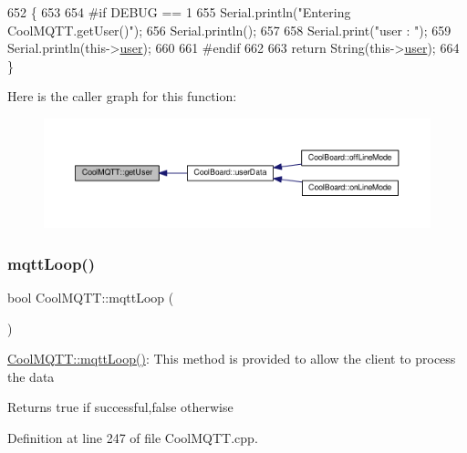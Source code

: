 \begin{DoxyCode}
652 \{
653 
654 \textcolor{preprocessor}{#if DEBUG == 1 }
655     Serial.println(\textcolor{stringliteral}{"Entering CoolMQTT.getUser()"});
656     Serial.println();
657     
658     Serial.print(\textcolor{stringliteral}{"user : "});
659     Serial.println(this->\hyperlink{classCoolMQTT_a8cd47e45d457f908d4b4390b35aaee83}{user});
660 
661 \textcolor{preprocessor}{#endif}
662 
663     \textcolor{keywordflow}{return} String(this->\hyperlink{classCoolMQTT_a8cd47e45d457f908d4b4390b35aaee83}{user});
664 \}
\end{DoxyCode}
Here is the caller graph for this function\+:
\nopagebreak
\begin{figure}[H]
\begin{center}
\leavevmode
\includegraphics[width=350pt]{classCoolMQTT_a373cc92fca7760d886f02d8a6e5b3f63_icgraph}
\end{center}
\end{figure}
\mbox{\label{classCoolMQTT_aa5eaae967b562b62cbcf2b8d81f6e5d5}} 
\subsubsection{\texorpdfstring{mqtt\+Loop()}{mqttLoop()}}
{\footnotesize\ttfamily bool Cool\+M\+Q\+T\+T\+::mqtt\+Loop (\begin{DoxyParamCaption}{ }\end{DoxyParamCaption})}

\hyperlink{classCoolMQTT_aa5eaae967b562b62cbcf2b8d81f6e5d5}{Cool\+M\+Q\+T\+T\+::mqtt\+Loop()}\+: This method is provided to allow the client to process the data

\begin{DoxyReturn}{Returns}
true if successful,false otherwise 
\end{DoxyReturn}


Definition at line 247 of file Cool\+M\+Q\+T\+T.\+cpp.



